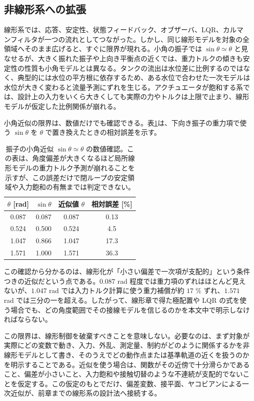 \subsection{非線形系への拡張}

線形系では、応答、安定性、状態フィードバック、オブザーバ、LQR、カルマンフィルタが一つの流れとしてつながった。しかし、同じ線形モデルを対象の全領域へそのまま広げると、すぐに限界が現れる。小角の振子では $\sin\theta\simeq\theta$ と見なせるが、大きく振れた振子や上向き平衡点の近くでは、重力トルクの傾きも安定性の性質も小角モデルとは異なる。タンクの流出は水位差に比例するのではなく、典型的には水位の平方根に依存するため、ある水位で合わせた一次モデルは水位が大きく変わると流量予測にずれを生じる。アクチュエータが飽和する系では、設計上の入力をいくら大きくしても実際の力やトルクは上限で止まり、線形モデルが仮定した比例関係が崩れる。

小角近似の限界は、数値だけでも確認できる。表\ref{tab:pendulum-smallangle-check}は、下向き振子の重力項で使う $\sin\theta$ を $\theta$ で置き換えたときの相対誤差を示す。
\begin{table}[tbp]
  \centering
  \caption{振子の小角近似 $\sin\theta\simeq\theta$ の数値確認。この表は、角度偏差が大きくなるほど局所線形モデルの重力トルク予測が崩れることを示すが、この誤差だけで閉ループの安定領域や入力飽和の有無までは判定できない。}
  \label{tab:pendulum-smallangle-check}
  \begin{tabular}{c|c|c|c}
    $\theta$ [rad] & $\sin\theta$ & 近似値 $\theta$ & 相対誤差 [\%]\\
    \hline
    0.087 & 0.087 & 0.087 & 0.13\\
    0.524 & 0.500 & 0.524 & 4.5\\
    1.047 & 0.866 & 1.047 & 17.3\\
    1.571 & 1.000 & 1.571 & 36.3
  \end{tabular}
\end{table}
この確認から分かるのは、線形化が「小さい偏差で一次項が支配的」という条件つきの近似だという点である。$0.087$ rad 程度では重力項のずれはほとんど見えないが、$1.047$ rad では入力トルク計算に使う重力補償が約 $17$ \% ずれ、$1.571$ rad では三分の一を超える。したがって、線形章で得た極配置や LQR の式を使う場合でも、どの角度範囲でその接線モデルを信じるのかを本文中で明示しなければならない。

この限界は、線形制御を破棄すべきことを意味しない。必要なのは、まず対象が実際にどの変数で動き、入力、外乱、測定量、制約がどのように関係するかを非線形モデルとして書き、そのうえでどの動作点または基準軌道の近くを扱うのかを明示することである。近似を使う場合は、関数がその近傍で十分滑らかであること、偏差が小さいこと、入力飽和や接触切替のような不連続が支配的でないことを仮定する。この仮定のもとでだけ、偏差変数、接平面、ヤコビアンによる一次近似が、前章までの線形系の設計法へ接続する。

